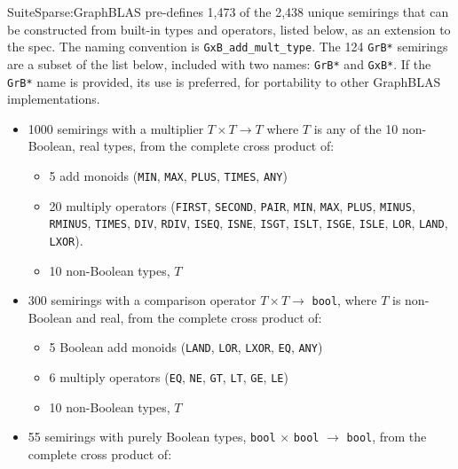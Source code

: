 \documentclass[12pt]{article}
\begin{document}
SuiteSparse:GraphBLAS pre-defines 1,473 of the 2,438 unique semirings that can
be constructed from built-in types and operators, listed below, as an extension
to the spec.  The naming convention is \verb'GxB_add_mult_type'.  The 124
\verb'GrB*' semirings are a subset of the list below, included with two names:
\verb'GrB*' and \verb'GxB*'.  If the \verb'GrB*' name is provided, its use is
preferred, for portability to other GraphBLAS implementations.

\vspace{-0.05in}
\begin{itemize}
\item 1000 semirings with a multiplier $T \times T \rightarrow T$ where $T$ is
    any of the 10 non-Boolean, real types, from the complete cross product of:

    \vspace{-0.05in}
    \begin{itemize}
    \item 5 add monoids (\verb'MIN', \verb'MAX', \verb'PLUS', \verb'TIMES', \verb'ANY')
    \item 20 multiply operators
    (\verb'FIRST', \verb'SECOND', \verb'PAIR', \verb'MIN', \verb'MAX',
    \verb'PLUS', \verb'MINUS', \verb'RMINUS', \verb'TIMES', \verb'DIV', \verb'RDIV',
    \verb'ISEQ', \verb'ISNE', \verb'ISGT',
    \verb'ISLT', \verb'ISGE', \verb'ISLE',
    \verb'LOR', \verb'LAND', \verb'LXOR').
    \item 10 non-Boolean types, $T$
    \end{itemize}

\item 300 semirings with a comparison operator $T \times T \rightarrow$
    \verb'bool', where $T$ is non-Boolean and real, from the complete cross product of:

    \vspace{-0.05in}
    \begin{itemize}
    \item 5 Boolean add monoids
    (\verb'LAND', \verb'LOR', \verb'LXOR', \verb'EQ', \verb'ANY')
    \item 6 multiply operators
    (\verb'EQ', \verb'NE', \verb'GT', \verb'LT', \verb'GE', \verb'LE')
    \item 10 non-Boolean types, $T$
    \end{itemize}

\item 55 semirings with purely Boolean types, \verb'bool' $\times$ \verb'bool'
    $\rightarrow$ \verb'bool', from the complete cross product of:


\end{itemize}
\end{document}
